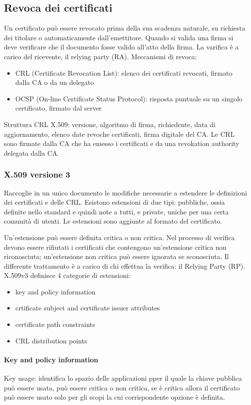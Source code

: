 \documentclass[11pt]{article}
\begin{document}
\subsection{Revoca dei certificati}
Un certificato può essere revocato prima della sua scadenza naturale, su richiesta dei titolare o automaticamente dall'emettitore.
Quando si valida una firma si deve verificare che il documento fosse valido all'atto della firma. La varifica è a carico 
del ricevente, il relying party (RA).
Meccanismi di revoca:
\begin{itemize}
    \item CRL (Certificate Revocation List): elenco dei certificati revocati, firmato dalla CA o da un delegato
    \item OCSP (On-line Certificate Status Protocol): risposta puntuale su un singolo certificato, firmato dal server 
\end{itemize}
Struttura CRL X.509: versione, algoritmo di firma, richiedente, data di aggiornamento, elenco date revoche certificati, 
firma digitale del CA.
Le CRL sono firmate dalla CA che ha emesso i certificati e da una revokation authority delegata dalla CA.
\subsubsection{X.509 versione 3}
Raccoglie in un unico documento le modifiche necessarie a estendere le definizioni dei certificati e delle CRL. Esistono 
estensioni di due tipi: pubbliche, ossia definite nello standard e quindi note a tutti, e private, uniche per una certa 
comunità di utenti. Le estensioni sono aggiunte al formato del certificato.

Un'estensione può essere definita critica o non critica. Nel processo di verifica devono essere rifiutati i certificati 
che contengono un'estensione critica non riconosciuta; un'estensione non critica può essere ignorata se sconosciuta. Il
differente trattamento è a carico di chi effettua la verifica: il Relying Party (RP).
X.509v3 definisce 4 categorie di estensioni:
\begin{itemize}
    \item key and policy information
    \item crtificate subject and certificate issuer attributes
    \item certificate path constraints
    \item CRL distribution points 
\end{itemize}
\paragraph*{Key and policy information}
Key usage: identifica lo spazio delle applicazioni pper il quale la chiave pubblica può essere usata, può essere critica 
o non critica, se è critica allora il certificato può essere usato solo per gli scopi la cui corrispondente opzione è definita.
\end{document}
